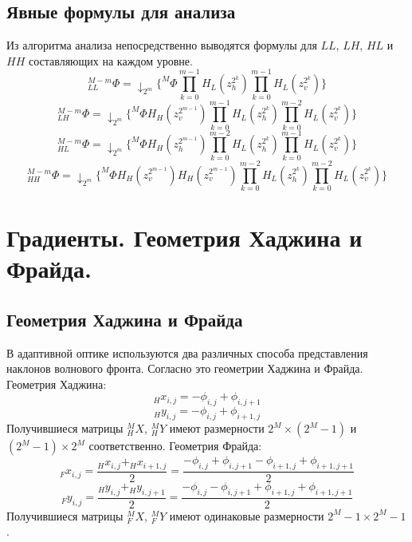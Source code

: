 \documentclass[oneside, final, 14pt]{extreport}
\begin{document}
\section{Явные формулы для анализа}
Из алгоритма анализа непосредственно выводятся формулы для $LL$, $LH$, $HL$ и $HH$ составляющих на каждом уровне.
\begin{equation}\label{LL}
_{LL}^{M-m}\Phi=
\downarrow_{2^m} \{^M\Phi\prod\limits_{k = 0}^{m-1} H_L(z_h^{2^k})
							\prod\limits_{k = 0}^{m-1} H_L(z_v^{2^k})\}
\end{equation}
\begin{equation}\label{LH}
_{LH}^{M-m}\Phi=
\downarrow_{2^m} \{^M\Phi H_H(z_v^{2^{m-1}}) \prod\limits_{k = 0}^{m-1} H_L(z_h^{2^k})
							\prod\limits_{k = 0}^{m-2} H_L(z_v^{2^k})\}
\end{equation}
\begin{equation}\label{HL}
_{HL}^{M-m}\Phi=\downarrow_{2^m} \{^M\Phi H_H(z_h^{2^{m-1}}) \prod\limits_{k = 0}^{m-2} H_L(z_h^{2^k})
						\prod\limits_{k = 0}^{m-1} H_L(z_v^{2^k})\}
\end{equation}
\begin{equation}\label{HH}
_{HH}^{M-m}\Phi=\downarrow_{2^m} \{^M\Phi H_H(z_v^{2^{m-1}}) H_H(z_v^{2^{m-1}}) \prod\limits_{k = 0}^{m-2} H_L(z_h^{2^k})
							\prod\limits_{k = 0}^{m-2} H_L(z_v^{2^k})\}
\end{equation}
\chapter{Градиенты. Геометрия Хаджина и Фрайда.}
\section{Геометрия Хаджина и Фрайда}
В адаптивной оптике используются два различных способа представления наклонов волнового фронта. Согласно %
это геометрии Хаджина и Фрайда.
Геометрия Хаджина:
$$_{H}x_{i,j}=-\phi_{i,j}+\phi_{i,j+1}$$
$$_{H}y_{i,j}=-\phi_{i,j}+\phi_{i+1,j}$$
Получившиеся матрицы $_H^{M}X$, $_H^{M}Y$ имеют размерности $2^M \times(2^M - 1)$ и $(2^M - 1) \times 2^M$ соответственно.
Геометрия Фрайда:
$$_{F}x_{i,j}=\frac{_{H}x_{i,j} + _{H}x_{i+1,j}}{2} = \frac{-\phi_{i,j}+\phi_{i,j+1}-\phi_{i+1,j}+\phi_{i+1,j+1}}{2}$$
$$_{F}y_{i,j}=\frac{_{H}y_{i,j} + _{H}y_{i,j+1}}{2} = \frac{-\phi_{i,j}-\phi_{i,j+1}+\phi_{i+1,j}+\phi_{i+1,j+1}}{2}$$
Получившиеся матрицы $_F^{M}X$, $_F^{M}Y$ имеют одинаковые размерности $2^M - 1 \times 2^M - 1$.
\end{document}

